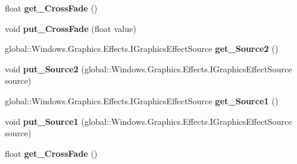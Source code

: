 \begin{DoxyCompactItemize}
float {\bfseries get\+\_\+\+Cross\+Fade} ()
\item 
\mbox{\label{interface_microsoft_1_1_graphics_1_1_canvas_1_1_effects_1_1_i_cross_fade_effect_a77159b902468d05e9b4edbd38789bea7}} 
void {\bfseries put\+\_\+\+Cross\+Fade} (float value)
\item 
\mbox{\label{interface_microsoft_1_1_graphics_1_1_canvas_1_1_effects_1_1_i_cross_fade_effect_aa4046ab138ef0fb93560d9f74875b5fb}} 
global\+::\+Windows.\+Graphics.\+Effects.\+I\+Graphics\+Effect\+Source {\bfseries get\+\_\+\+Source2} ()
\item 
\mbox{\label{interface_microsoft_1_1_graphics_1_1_canvas_1_1_effects_1_1_i_cross_fade_effect_ae9a7ddede25c924649cded934e81b457}} 
void {\bfseries put\+\_\+\+Source2} (global\+::\+Windows.\+Graphics.\+Effects.\+I\+Graphics\+Effect\+Source source)
\item 
\mbox{\label{interface_microsoft_1_1_graphics_1_1_canvas_1_1_effects_1_1_i_cross_fade_effect_a6cf8a47d6e17902e59cbfba37f8bc6d4}} 
global\+::\+Windows.\+Graphics.\+Effects.\+I\+Graphics\+Effect\+Source {\bfseries get\+\_\+\+Source1} ()
\item 
\mbox{\label{interface_microsoft_1_1_graphics_1_1_canvas_1_1_effects_1_1_i_cross_fade_effect_aa61455b872f1f3db557618ac68112384}} 
void {\bfseries put\+\_\+\+Source1} (global\+::\+Windows.\+Graphics.\+Effects.\+I\+Graphics\+Effect\+Source source)
\item 
\mbox{\label{interface_microsoft_1_1_graphics_1_1_canvas_1_1_effects_1_1_i_cross_fade_effect_af6d5c5f211f2a0d5dcebe870e4d0faa4}} 
float {\bfseries get\+\_\+\+Cross\+Fade} ()
\item 
\mbox{\label{interface_microsoft_1_1_graphics_1_1_canvas_1_1_effects_1_1_i_cross_fade_effect_a77159b902468d05e9b4edbd38789bea7}} 

\end{DoxyCompactItemize}
